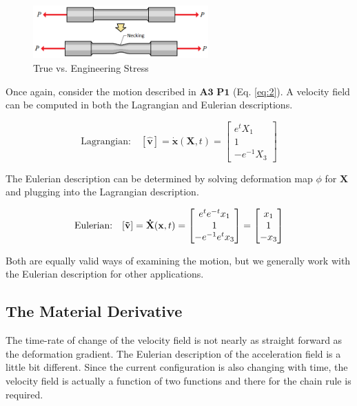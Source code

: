 \documentclass[a4paper]{article}
\begin{document}
\begin{figure}[ht!]
\centering
\includegraphics[width=0.6\textwidth]{engineering_stress.png}
\caption{\label{fig:engineering_stress}True vs. Engineering Stress}
\end{figure}
\FloatBarrier

Once again, consider the motion described in $\mathbf{A3}$ $\mathbf{P1}$ (Eq. \ref{eq:2}). A velocity field can be computed in both the Lagrangian and Eulerian descriptions. 

\begin{equation}
    \text{Lagrangian:} \quad [\mathbf{\hat{v}}] = \mathbf{\dot{x}}(\mathbf{X},t) = 
    \begin{bmatrix}
      e^t X_1 \\
      1 \\
      -e^{-1}X_3
    \end{bmatrix}
\end{equation}

The Eulerian description can be determined by solving deformation map $\phi$ for $\mathbf{X}$ and plugging into the Lagrangian description. 

\begin{equation}
    \text{Eulerian:} \quad [\mathbf{\Tilde{v}}] = \mathbf{\dot{X}}(\mathbf{x},t) = 
    \begin{bmatrix}
      e^t e^{-t}x_1 \\
      1 \\
      -e^{-1}e^tx_3
    \end{bmatrix}
    =
    \begin{bmatrix}
      x_1 \\
      1 \\
      -x_3
    \end{bmatrix}
\end{equation}

Both are equally valid ways of examining the motion, but we generally work with the Eulerian description for other applications. 

\subsection{The Material Derivative}
The time-rate of change of the velocity field is not nearly as straight forward as the deformation gradient. The Eulerian description of the acceleration field is a little bit different. Since the current configuration is also changing with time, the velocity field is actually a function of two functions and there for the chain rule is required. 
 
\end{document}
